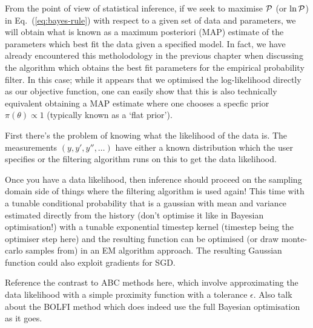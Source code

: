 From the point of view of statistical inference, if we seek to maximise ${\cal P}$ (or $\ln {\cal P}$) in Eq.~(\ref{eq:bayes-rule}) with respect to a given set of data and parameters, we will obtain what is known as a maximum posteriori (MAP) estimate of the parameters which best fit the data given a specified model. In fact, we have already encountered this metholodology in the previous chapter when discussing the algorithm which obtains the best fit parameters for the empirical probability filter. In this case; while it appears that we optimised the log-likelihood directly as our objective function, one can easily show that this is also technically equivalent obtaining a MAP estimate where one chooses a specfic prior $\pi (\theta ) \propto 1$ (typically known as a `flat prior').


First there's the problem of knowing what the likelihood of the data is. The measurements $(y, y', y'', \dots)$ have either a known distribution which the user specifies or the filtering algorithm runs on this to get the data likelihood.

Once you have a data likelihood, then inference should proceed on the sampling domain side of things where the filtering algorithm is used again! This time with a tunable conditional probability that is a gaussian with mean and variance estimated directly from the history (don't optimise it like in Bayesian optimisation!) with a tunable exponential timestep kernel (timestep being the optimiser step here) and the resulting function can be optimised (or draw monte-carlo samples from) in an EM algorithm approach. The resulting Gaussian function could also exploit gradients for SGD.

Reference the contrast to ABC methods here, which involve approximating the data likelihood with a simple proximity function with a tolerance $\epsilon$. Also talk about the BOLFI method which does indeed use the full Bayesian optimisation as it goes.

